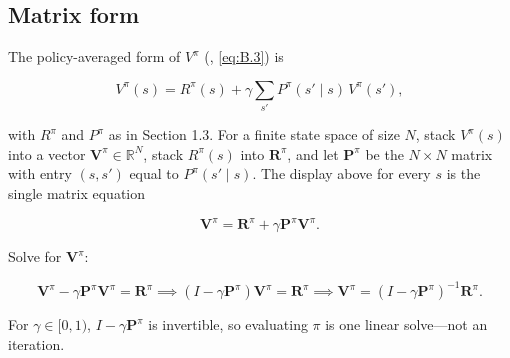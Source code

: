 \subsection{Matrix form}
The policy-averaged form of $V^\pi$ (, \eqref{eq:B.3}) is

\[
V^\pi(s)
=
R^\pi(s)
+
\gamma
\sum_{s'}
P^\pi(s' \mid s)\, V^\pi(s'),
\]

with $R^\pi$ and $P^\pi$ as in Section 1.3. For a finite state space of size $N$, stack $V^\pi(s)$ into a vector $\mathbf{V}^\pi\in\mathbb{R}^N$, stack $R^\pi(s)$ into $\mathbf{R}^\pi$, and let $\mathbf{P}^\pi$ be the $N\times N$ matrix with entry $(s,s')$ equal to $P^\pi(s'\mid s)$. The display above for every $s$ is the single matrix equation

\[
\mathbf{V}^\pi = \mathbf{R}^\pi + \gamma \mathbf{P}^\pi \mathbf{V}^\pi.
\]

Solve for $\mathbf{V}^\pi$:

\begin{equation}
\mathbf{V}^\pi - \gamma \mathbf{P}^\pi \mathbf{V}^\pi = \mathbf{R}^\pi
\implies
(I - \gamma \mathbf{P}^\pi)\mathbf{V}^\pi = \mathbf{R}^\pi
\implies
\mathbf{V}^\pi = (I - \gamma \mathbf{P}^\pi)^{-1} \mathbf{R}^\pi.
\tag{2.6}
\end{equation}

For $\gamma\in[0,1)$, $I-\gamma\mathbf{P}^\pi$ is invertible, so evaluating $\pi$ is one linear solve---not an iteration.

